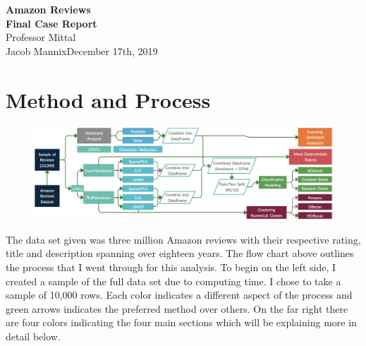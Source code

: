 \documentclass[a4paper, 11pt]{article}
\begin{document}
\noindent
\large\textbf{Amazon Reviews} \\
\textbf{Final Case Report} \\
\normalsize Professor Mittal \\
Jacob Mannix\hfill December 17th, 2019 \\
 
\section*{Method and Process}

\begin{figure}[h]
  \includegraphics[width=\linewidth]{tree}
\end{figure}
\noindent
The data set given was three million Amazon reviews with their respective rating, title and description spanning over eighteen years. The flow chart above outlines the process that I went through for this analysis. To begin on the left side, I created a sample of the full data set due to computing time.  I chose to take a sample of 10,000 rows. Each color indicates a different aspect of the process and green arrows indicates the preferred method over others. On the far right there are four colors indicating the four main sections which will be explaining more in detail below.
\end{document}
